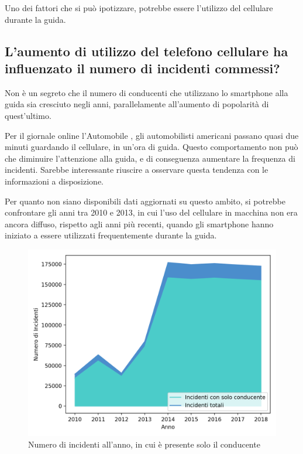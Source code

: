 \documentclass[a4paper,12pt]{report}
\begin{document}
Uno dei fattori che si può ipotizzare, potrebbe 
essere l'utilizzo del cellulare durante la guida. 

\subsection{L'aumento di utilizzo del telefono cellulare ha influenzato il numero di incidenti commessi?}

Non è un segreto che il numero di conducenti 
che utilizzano lo smartphone alla guida 
sia cresciuto negli anni, parallelamente all'aumento di popolarità di quest'ultimo. 

Per il giornale online l'Automobile \cite{AUTOMOBILE:1}, gli automobilisti americani 
passano quasi due minuti guardando il cellulare, in un'ora di guida. 
Questo comportamento non può che diminuire l'attenzione alla guida, e di conseguenza 
aumentare la frequenza di incidenti. 
Sarebbe interessante riuscire a osservare questa tendenza con le 
informazioni a disposizione. 

Per quanto non siano disponibili dati aggiornati su questo ambito, si potrebbe confrontare gli 
anni tra 2010 e 2013, in cui l'uso del cellulare in macchina non era ancora diffuso, 
rispetto agli anni più recenti, quando gli smartphone hanno iniziato a essere utilizzati 
frequentemente durante la guida. 

\begin{figure}
    \includegraphics[width=\linewidth]{../src/incidenti/incidenti_senza_coords/anno/incremento_incidenti.png}
    \caption{Numero di incidenti all'anno, in cui è presente solo il conducente}
    \label{fig:incremento-incidenti}
\end{figure}
\end{document}
